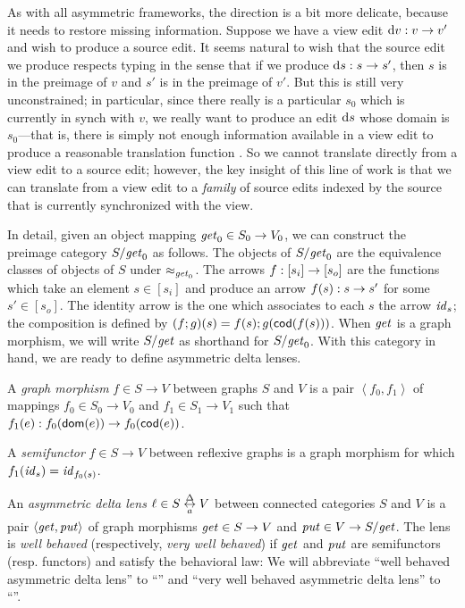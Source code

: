 As with all asymmetric frameworks, the \PUT direction is a bit more
delicate, because it needs to restore missing information. Suppose we have a
view edit $\textrm{d} v : v \to v'$ and wish to produce a source edit. It seems
natural to wish that the source edit we produce respects typing in the sense
that if we produce $\textrm{d} s : s \to s'$, then $s$ is in the preimage of $v$
and $s'$ is in the preimage of $v'$. But this is still very unconstrained;
in particular, since there really is a particular $s_0$ which is currently
in synch with $v$, we really want to produce an edit $\textrm{d} s$ whose domain is
$s_0$---that is, there is simply not enough information available in a view
edit to produce a reasonable translation function \PUT. So we cannot
translate directly from a view edit to a source edit; however, the key
insight of this line of work is that we can translate from a view edit to a
\emph{family} of source edits indexed by the source that is currently
synchronized with the view.

In detail, given an object mapping $\mathit{get}_0 \in S_0 \to V_0$, we can
construct the preimage category $S/\mathit{get}_0$ as follows. The objects of
$S/\mathit{get}_0$ are the equivalence classes of objects of $S$ under
$\approx_{\mathit{get}_0}$. The arrows $f : [s_i] \to [s_o]$ are the functions
which take an element $s \in [s_i]$ and produce an arrow $f(s) : s \to
s'$ for some $s' \in [s_o]$. The identity arrow is the one which associates
to each $s$ the arrow $\mathit{id}_s$; the composition is defined by
$(f;g)(s)=f(s);g(\mathsf{cod}(f(s)))$. When $\mathit{get}$ is a graph morphism, we will
write $S/\mathit{get}$ as shorthand for $S/\mathit{get}_0$. With this category in hand, we
are ready to define asymmetric delta lenses.

\begin{definition}
    A \emph{graph morphism} $f \in S \to V$ between graphs $S$ and $V$ is a
    pair $\left<f_0,f_1\right>$ of mappings $f_0 \in S_0 \to V_0$ and $f_1
    \in S_1 \to V_1$ such that $f_1(e) : f_0(\mathsf{dom}(e)) \to
    f_0(\mathsf{cod}(e))$.
\end{definition}

\begin{definition}
    A \emph{semifunctor} $f \in S \to V$ between reflexive graphs is a graph
    morphism for which $f_1(\mathit{id}_s)=\mathit{id}_{f_0(s)}$.
\end{definition}

\begin{definition}
    An \emph{asymmetric delta lens} $\ell \in S \adlens V$ between connected
    categories $S$ and $V$ is a pair $\left<\mathit{get},\mathit{put}\right>$ of graph
    morphisms $\mathit{get} \in S \to V$ and $\mathit{put} \in V \to S/\mathit{get}$. The lens is
    \emph{well behaved} (respectively, \emph{very well behaved}) if $\mathit{get}$
    and $\mathit{put}$ are semifunctors (resp. functors) and satisfy the behavioral
    law:
    We will abbreviate ``well behaved asymmetric delta lens'' to ``\WBADL''
    and ``very well behaved asymmetric delta lens'' to ``\VWBADL''.
\end{definition}

